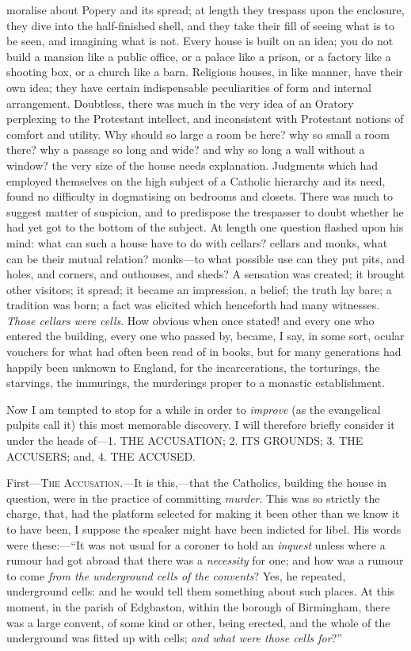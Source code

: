 moralise about Popery and its spread; at length they
trespass upon the enclosure, they dive into the
half-finished shell, and they take their fill of seeing
what is to be seen, and imagining what is not. Every
house is built on an idea; you do not build a mansion
like a public office, or a palace like a prison, or a
factory like a shooting box, or a church like a barn.
Religious houses, in like manner, have their own idea;
they have certain indispensable peculiarities of form and
internal arrangement. Doubtless, there was much in the
very idea of an Oratory perplexing to the Protestant
intellect, and inconsistent with Protestant notions of
comfort and utility. Why should so large a room be here?
why so small a room there? why a passage so long and
wide? and why so long a wall without a window? the very
size of the house needs explanation. Judgments which had
employed themselves on the high subject of a Catholic
hierarchy and its need, found no difficulty in
dogmatising on bedrooms and closets. There was much to
suggest matter of suspicion, and to predispose the
trespasser to doubt whether he had yet got to the bottom
of the subject. At length one question flashed upon his mind: what can such a house have to do with cellars?
cellars and monks, what can be their mutual relation?
monks—to what possible use can they put pits, and
holes, and corners, and outhouses, and sheds? A sensation
was created; it brought other visitors; it spread; it
became an impression, a belief; the truth lay bare; a
tradition was born; a fact was elicited which henceforth
had many witnesses. \emph{Those cellars were cells}.
How obvious when once stated! and every one who entered
the building, every one who passed by, became, I say, in
some sort, ocular vouchers for what had often been read
of in books, but for many generations had happily been
unknown to England, for the incarcerations, the
torturings, the starvings, the immurings, the murderings
proper to a monastic establishment.

Now I am tempted to stop for a while in order to \emph{improve}
(as the evangelical pulpits call it) this most memorable
discovery. I will therefore briefly consider it under the
heads of—1. THE ACCUSATION; 2. ITS
GROUNDS; 3. THE ACCUSERS; and, 4. THE
ACCUSED.

First—T\textsc{he} A\textsc{ccusation}.—It is this,—that
the Catholics, building the house in question, were in
the practice of committing \emph{murder}. This was so
strictly the charge, that, had the platform selected for
making it been other than we know it to have been, I
suppose the speaker might have been indicted for libel.
His words were these:—``It was not usual for a
coroner to hold an \emph{inquest} unless where a rumour
had got abroad that there was a \emph{necessity} for
one; and how was a rumour to come \emph{from the
underground cells of the convents}? Yes, he repeated,
underground cells: and he would tell them something about
such places. At this moment, in the parish of Edgbaston,
within the borough of Birmingham, there was a large
convent, of some kind or other, being erected, and the
whole of the underground was fitted up with cells; \emph{and
what were those cells for}?''

